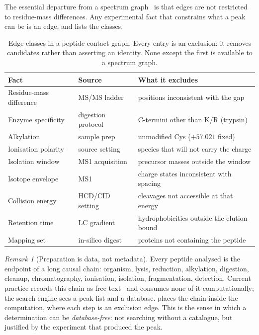 \documentclass[11pt,a4paper]{article}
\theoremstyle{definition}
\theoremstyle{remark}
\newtheorem{remark}[theorem]{Remark}
\begin{document}
The essential departure from a spectrum
graph~\citep{dancik1999novo} is that edges are not restricted to
residue-mass differences. Any experimental fact that constrains what a
peak can be is an edge, and  lists the classes.

\begin{table}[t]
\centering
\small
\caption{Edge classes in a peptide contact graph. Every entry is an
exclusion: it removes candidates rather than asserting an identity.
None except the first is available to a spectrum graph.}
\label{tab:edges}
\begin{tabular}{@{}p{}p{}p{}@{}}
\toprule
\textbf{Fact} & \textbf{Source} & \textbf{What it excludes} \\
\midrule
Residue-mass difference & MS/MS ladder & positions inconsistent with the gap \\
Enzyme specificity & digestion protocol~\citep{olsen2004trypsin} & C-termini other than K/R (trypsin) \\
Alkylation & sample prep~\citep{sechi1998method} & unmodified Cys ($+57.021$ fixed) \\
Ionisation polarity & source setting~\citep{fenn1989electrospray} & species that will not carry the charge \\
Isolation window & MS1 acquisition & precursor masses outside the window \\
Isotope envelope & MS1 & charge states inconsistent with spacing \\
Collision energy & HCD/CID setting~\citep{olsen2007higher} & cleavages not accessible at that energy \\
Retention time & LC gradient~\citep{krokhin2006sequence} & hydrophobicities outside the elution bound \\
Mapping set & in-silico digest & proteins not containing the peptide \\
\bottomrule
\end{tabular}
\end{table}

\begin{remark}[Preparation is data, not metadata]
\label{rem:prep}
Every peptide analysed is the endpoint of a long causal chain: organism,
lysis, reduction, alkylation, digestion, cleanup, chromatography,
ionisation, isolation, fragmentation, detection. Current practice records
this chain as free text~\citep{taylor2007guidelines} and consumes none of
it computationally; the search engine sees a peak list and a database.
 places the chain inside the computation, where each step
is an exclusion edge. This is the sense in which a determination can be
\emph{database-free}: not searching without a catalogue, but justified by
the experiment that produced the peak.
\end{remark}
\end{document}
